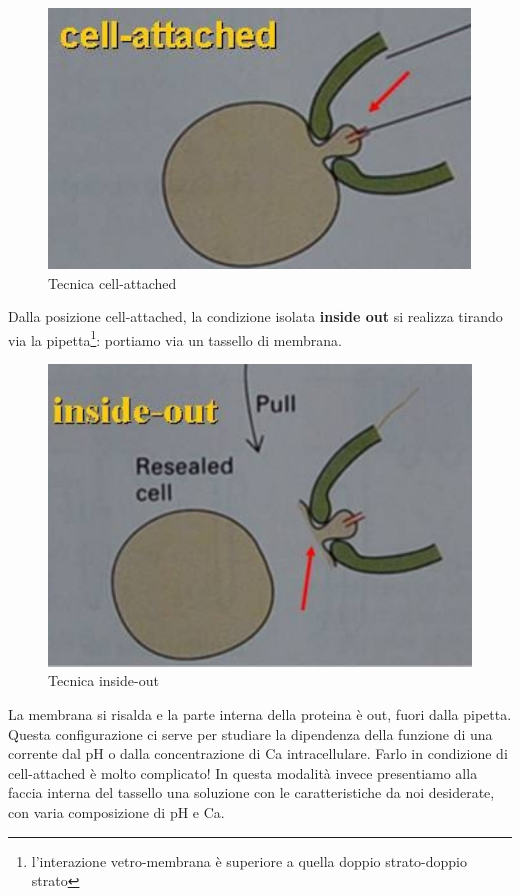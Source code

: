 \documentclass[a4paper,12pt]{article}
\begin{document}
\begin{figure}[H]
\centering
\includegraphics[scale=0.35]{immagine/cell.jpg}
\caption{Tecnica cell-attached}
\end{figure}

Dalla posizione cell-attached, la condizione isolata \textbf{inside out} si realizza tirando via la pipetta\footnote{l'interazione vetro-membrana è superiore a quella doppio strato-doppio strato}: portiamo via un tassello di membrana. 
\begin{figure}[H]
\centering
\includegraphics[scale=0.35]{immagine/inside.jpg}
\caption{Tecnica inside-out}
\end{figure}

La membrana si risalda e la parte interna della proteina è out, fuori dalla pipetta. Questa configurazione ci serve per studiare la dipendenza della funzione di una corrente dal pH o dalla concentrazione di Ca intracellulare. 
Farlo in condizione di cell-attached è molto complicato! In questa modalità invece presentiamo alla faccia interna del tassello una soluzione con le caratteristiche da noi desiderate, con varia composizione di pH e Ca. 
\end{document}
